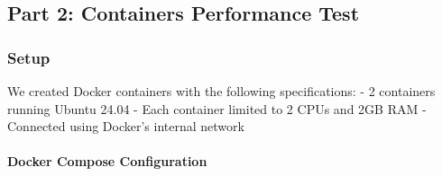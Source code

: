 \hypertarget{part-2-containers-performance-test}{%
\subsection{Part 2: Containers Performance
Test}\label{part-2-containers-performance-test}}

\hypertarget{setup-1}{%
\subsubsection{Setup}\label{setup-1}}

We created Docker containers with the following specifications: - 2
containers running Ubuntu 24.04 - Each container limited to 2 CPUs and
2GB RAM - Connected using Docker's internal network

\hypertarget{docker-compose-configuration}{%
\paragraph{Docker Compose
Configuration}\label{docker-compose-configuration}}

